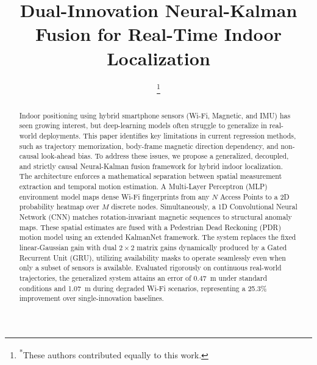 \documentclass[conference]{IEEEtran}
\begin{document}
\title{Dual-Innovation Neural-Kalman Fusion for Real-Time Indoor Localization}

\author{
\thanks{\textsuperscript{*}These authors contributed equally to this work.}
}

\maketitle

\begin{abstract}
Indoor positioning using hybrid smartphone sensors (Wi-Fi, Magnetic, and IMU) has seen growing interest, but deep-learning models often struggle to generalize in real-world deployments. This paper identifies key limitations in current regression methods, such as trajectory memorization, body-frame magnetic direction dependency, and non-causal look-ahead bias. To address these issues, we propose a generalized, decoupled, and strictly causal Neural-Kalman fusion framework for hybrid indoor localization. The architecture enforces a mathematical separation between spatial measurement extraction and temporal motion estimation. A Multi-Layer Perceptron (MLP) environment model maps dense Wi-Fi fingerprints from any $N$ Access Points to a 2D probability heatmap over $M$ discrete nodes. Simultaneously, a 1D Convolutional Neural Network (CNN) matches rotation-invariant magnetic sequences to structural anomaly maps. These spatial estimates are fused with a Pedestrian Dead Reckoning (PDR) motion model using an extended KalmanNet framework. The system replaces the fixed linear-Gaussian gain with dual $2\times2$ matrix gains dynamically produced by a Gated Recurrent Unit (GRU), utilizing availability masks to operate seamlessly even when only a subset of sensors is available. Evaluated rigorously on continuous real-world trajectories, the generalized system attains an error of 0.47~m under standard conditions and 1.07~m during degraded Wi-Fi scenarios, representing a 25.3\% improvement over single-innovation baselines.
\end{abstract}
\end{document}
